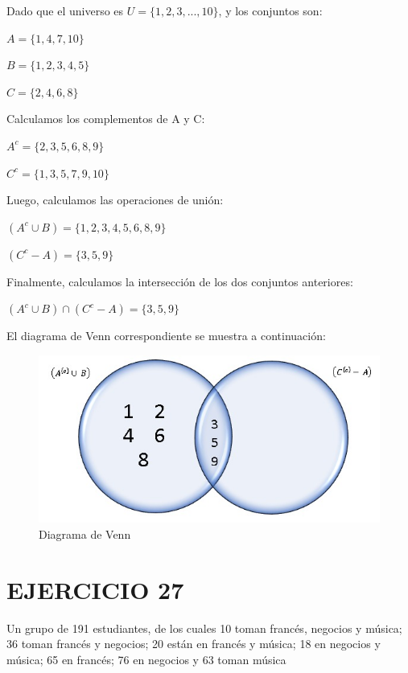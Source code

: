 \documentclass[
  letterpaper,
  DIV=11,
  numbers=noendperiod]{scrartcl}
\begin{document}
Dado que el universo es \(U=\{1, 2, 3, . . . , 10\}\), y los conjuntos
son:

\(A = \{1,4,7,10\}\)

\(B = \{1,2,3,4,5\}\)

\(C = \{2,4,6,8\}\)

Calculamos los complementos de A y C:

\(A^{c} = \{2, 3, 5, 6, 8 ,9\}\)

\(C^{c} = \{1, 3, 5, 7, 9, 10\}\)

Luego, calculamos las operaciones de unión:

\((A^{c} ∪ B) = \{1,2,3,4,5,6,8,9\}\)

\((C^{c} - A) = \{3,5,9\}\)

Finalmente, calculamos la intersección de los dos conjuntos anteriores:

\((A^{c} ∪ B) ∩ (C^{c} - A) = \{3,5,9\}\)

El diagrama de Venn correspondiente se muestra a continuación:

\begin{figure}

{\centering \includegraphics{venn.jpg}

}

\caption{Diagrama de Venn}

\end{figure}

\hypertarget{ejercicio-27}{%
\section{EJERCICIO 27}\label{ejercicio-27}}

Un grupo de 191 estudiantes, de los cuales 10 toman francés, negocios y
música; 36 toman francés y negocios; 20 están en francés y música; 18 en
negocios y música; 65 en francés; 76 en negocios y 63 toman música
\end{document}
